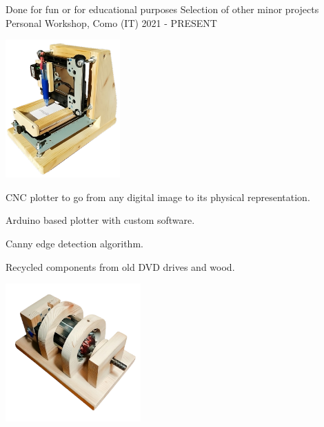 \begin{cventries}
  \cventry
  {Done for fun or for educational purposes}
  {Selection of other minor projects}
  {Personal Workshop, Como (IT)}
  {2021 - PRESENT}
  {
    \begin{minipage}{0.45\textwidth}
      \vspace{5pt}
      \begin{center}
        \includegraphics[height=150pt]{common/img/Minors/Gorlu.png}
        \hspace{4cm}
      \end{center}
      \vspace{5pt}
      CNC plotter to go from any digital image to its physical representation.\\
      \begin{cvitems}
        \item {Arduino based plotter with custom software.}
        \item {Canny edge detection algorithm.}
        \item {Recycled components from old DVD drives and wood.}
      \end{cvitems}
      \vspace{4mm}
      \vspace{5pt}
    \end{minipage}
    \hfill
    \begin{minipage}{0.45\textwidth}
      \vspace{5pt}
      \begin{center}
        \includegraphics[height=150pt]{common/img/Minors/Joppo.png}

\end{center}
\end{minipage}}
\end{cventries}
